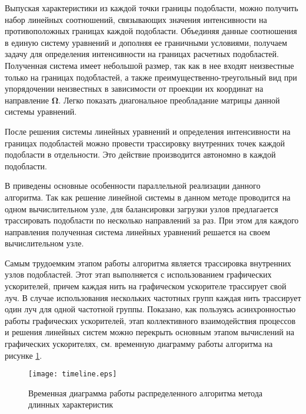 Выпуская характеристики из каждой точки границы подобласти, можно получить набор линейных соотношений, связывающих значения интенсивности на противоположных границах каждой подобласти. Объединяя данные соотношения в единую систему уравнений и дополняя ее граничными условиями, получаем задачу для определения интенсивности на границах расчетных подобластей. Полученная система имеет небольшой размер, так как в нее входят неизвестные только на границах подобластей, а также преимущественно-треугольный вид при упорядочении неизвестных в зависимости от проекции их координат на направление $\boldsymbol \Omega$. Легко показать диагональное преобладание матрицы данной системы уравнений.

После решения системы линейных уравнений и определения интенсивности на границах подобластей можно провести трассировку внутренних точек каждой подобласти в отдельности. Это действие производится автономно в каждой подобласти.

В  приведены основные особенности параллельной реализации данного алгоритма. Так как решение линейной системы в данном методе проводится на одном вычислительном узле, для балансировки загрузки узлов предлагается трассировать подобласти по несколько направлений за раз. При этом для каждого направления полученная система линейных уравнений решается на своем вычислительном узле.

Самым трудоемким этапом работы алгоритма является трассировка внутренних узлов подобластей. Этот этап выполняется с использованием графических ускорителей, причем каждая нить на графическом ускорителе трассирует свой луч. В случае использования нескольких частотных групп каждая нить трассирует один луч для одной частотной группы.
Показано, как пользуясь асинхронностью работы графических ускорителей, этап коллективного взаимодействия процессов и решения линейных систем можно перекрыть основным этапом вычислений на графических ускорителях, см. временную диаграмму работы алгоритма на рисунке \ref{fig:timeline}.
\begin{figure}[ht!]
\centering
\texttt{[image: timeline.eps]}
\caption{Временная диаграмма работы распределенного алгоритма метода длинных характеристик}
\label{fig:timeline}
\end{figure}


